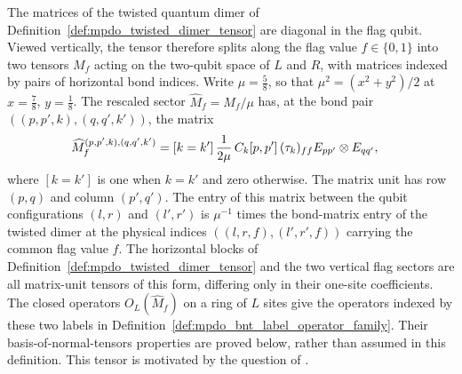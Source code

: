 \begin{definition}%
    \label{def:mpdo_twisted_dimer_flag_sectors}
    \leanok
    The matrices of the twisted quantum dimer of
    Definition~\ref{def:mpdo_twisted_dimer_tensor} are diagonal in the flag
    qubit. Viewed vertically, the tensor therefore splits along the flag
    value $f\in\{0,1\}$ into two tensors $M_f$ acting on the two-qubit
    space of $L$ and $R$, with matrices indexed by pairs of horizontal bond
    indices. Write $\mu=\frac58$, so that $\mu^2=(x^2+y^2)/2$ at
    $x=\frac78$, $y=\frac18$. The rescaled sector $\widehat M_f=M_f/\mu$
    has, at the bond pair $((p,p',k),(q,q',k'))$, the matrix
    \begin{align}
        \widehat M_f^{(p,p',k),(q,q',k')}
         & =[k=k']\,\frac1{2\mu}\,C_k[p,p']\,(\tau_k)_{ff}
        E_{pp'}\otimes E_{qq'},
        \notag
    \end{align}
    where $[k=k']$ is one when $k=k'$ and zero otherwise.
    The matrix unit has row $(p,q)$ and column $(p',q')$.
    The entry of this matrix between the qubit configurations $(l,r)$ and
    $(l',r')$ is $\mu^{-1}$ times the bond-matrix entry of the twisted
    dimer at the physical indices $((l,r,f),(l',r',f))$ carrying the common
    flag value $f$. The horizontal blocks of
    Definition~\ref{def:mpdo_twisted_dimer_tensor} and the two vertical flag
    sectors are all matrix-unit tensors of this form, differing only in their
    one-site coefficients. The closed operators $O_L(\widehat M_f)$ on a ring
    of $L$ sites give the operators indexed by these two labels in
    Definition~\ref{def:mpdo_bnt_label_operator_family}. Their
    basis-of-normal-tensors properties are proved below, rather than assumed in
    this definition. This tensor is motivated by the question of
    \cite[lines~995--1010]{Cirac2016MPDO_arXiv}.
\end{definition}

